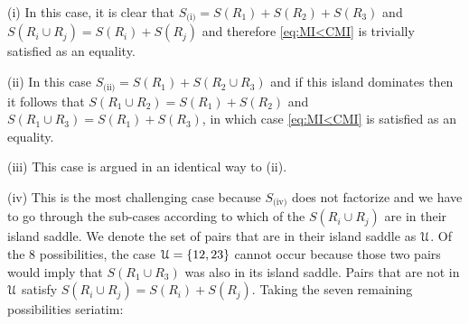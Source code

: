 \documentclass[12pt]{article}
\begin{document}
\noindent (i) In this case, it is clear that $S_\text{(i)}= S(R_1) + S(R_2) + S(R_3)$ and $S(R_i\cup R_j)=S(R_i)+S(R_j)$ and therefore \eqref{eq:MI<CMI} is trivially satisfied as an equality.

\noindent (ii) In this case $S_\text{(ii)}= S(R_1) + S(R_2 \cup R_3)$ and if this island dominates then it follows that $S(R_1 \cup R_2) = S(R_1) + S(R_2)$ and $S(R_1 \cup R_3) = S(R_1) + S(R_3)$, in which case  \eqref{eq:MI<CMI} is satisfied as an equality. 

\noindent (iii) This case is argued in an identical way to (ii).

\noindent (iv) This is  the most challenging case because $S_\text{(iv)}$ does not factorize and we have to go through the sub-cases according to which of the $S(R_i\cup R_j)$ are in their island saddle. We denote the set of pairs that are in their island saddle as $\EuScript U$. Of the 8 possibilities, the case $\EuScript U=\{12,23\}$ cannot occur because those two pairs would imply that $S(R_1\cup R_3)$ was also in its island saddle. Pairs that are not in $\EuScript U$ satisfy $S(R_i\cup R_j)=S(R_i)+S(R_j)$. Taking the seven remaining possibilities seriatim:
\end{document}
